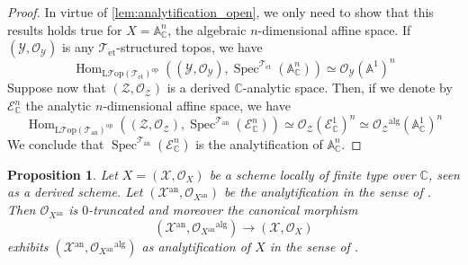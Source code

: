 \documentclass[12pt,a4paper,reqno]{amsart}
\theoremstyle{plain}
\newtheorem{prop}[thm]{Proposition}
\theoremstyle{definition}
\theoremstyle{remark}
\numberwithin{equation}{section}
\begin{document}
\begin{proof}
	In virtue of \cref{lem:analytification_open}, we only need to show that this results holds true for $X = \mathbb A^n_{\mathbb C}$, the algebraic $n$-dimensional affine space.
	If $({\mathcal Y}, {\mathcal O}_{\mathcal Y})$ is any ${{\mathcal T}_{\mathrm{\acute{e}t}}}$-structured topos, we have
	\[ \operatorname{Hom}_{{\mathrm{L} \mathcal{T} \mathrm{op}}({{\mathcal T}_{\mathrm{\acute{e}t}}})^{\mathrm{op}}} (({\mathcal Y}, {\mathcal O}_{\mathcal Y}), \operatorname{Spec}^{{\mathcal T}_{\mathrm{\acute{e}t}}}(\mathbb A^n_{\mathbb C})) \simeq {\mathcal O}_{\mathcal Y}(\mathbb A^1)^n \]
	Suppose now that $({\mathcal Z}, {\mathcal O}_{\mathcal Z})$ is a derived {$\mathbb C$-analytic\xspace} space. Then, if we denote by $\mathcal E^n_{\mathbb C}$ the analytic $n$-dimensional affine space, we have
	\[ \operatorname{Hom}_{{\mathrm{L} \mathcal{T} \mathrm{op}}({{\mathcal T}_{\mathrm{an}}})^{\mathrm{op}}} ( ({\mathcal Z}, {\mathcal O}_{\mathcal Z}), \operatorname{Spec}^{{\mathcal T}_{\mathrm{an}}}(\mathcal E^n_{\mathbb C}) ) \simeq {\mathcal O}_{\mathcal Z}(\mathcal E^1_{\mathbb C})^n \simeq {\mathcal O}_{\mathcal Z}{^\mathrm{alg}}(\mathbb A^1_{\mathbb C})^n \]
	We conclude that $\operatorname{Spec}^{{\mathcal T}_{\mathrm{an}}}(\mathcal E^n_{\mathbb C})$ is the analytification of $\mathbb A^n_{\mathbb C}$.
\end{proof}

\begin{prop} \label{prop:comparison_classical_analytification}
	Let $X = ({\mathcal X}, {\mathcal O}_X)$ be a scheme locally of finite type over $\mathbb C$, seen as a derived scheme.
	Let $({\mathcal X}{^\mathrm{an}}, {\mathcal O}_{X{^\mathrm{an}}})$ be the analytification in the sense of \cite{DAG-IX}.
	Then ${\mathcal O}_{X{^\mathrm{an}}}$ is $0$-truncated and moreover the canonical morphism
	\[ ({\mathcal X}{^\mathrm{an}}, {\mathcal O}_{X{^\mathrm{an}}}{^\mathrm{alg}}) \to ({\mathcal X}, {\mathcal O}_X) \]
	exhibits $({\mathcal X}{^\mathrm{an}}, {\mathcal O}_{X{^\mathrm{an}}}{^\mathrm{alg}})$ as analytification of $X$ in the sense of \cite{SGA1}.
\end{prop}
\end{document}
